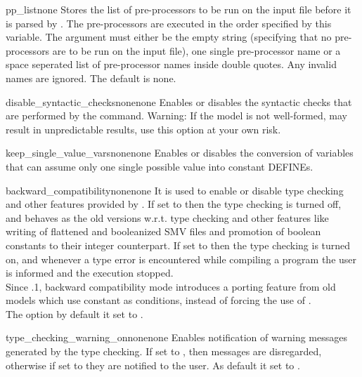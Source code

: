 \begin{nusmvVar} {pp\_list}{}{none}
Stores the list of pre-processors to be run on the input file before
it is parsed by \nusmv. The pre-processors are executed in the order
specified by this variable. The argument must either be the empty
string (specifying that no pre-processors are to be run on the input
file), one single pre-processor name or a space seperated list of
pre-processor names inside double quotes. Any invalid names are
ignored. The default is none.
\end{nusmvVar}



\begin{nusmvVar} {disable\_syntactic\_checks}{none}{none}
Enables or disables the syntactic checks that are performed by
the  command. Warning: If the model
is not well-formed, \nusmv may result in unpredictable results, use
this option at your own risk.
\end{nusmvVar}

\begin{nusmvVar} {keep\_single\_value\_vars}{none}{none}
Enables or disables the conversion of variables that can assume only
one single possible value into constant DEFINEs.
\end{nusmvVar}

\label{ref::backwardcompatibility}
\begin{nusmvVar} {backward\_compatibility}{none}{none}
  It is used to enable or disable type checking and other features
  provided by \NuSMV. If set to  then the type checking is
  turned off, and \nusmv behaves as the old versions w.r.t. type
  checking and other features like writing of flattened and
  booleanized SMV files and promotion of boolean constants to their
  integer counterpart. If set to  then the type checking is
  turned on, and whenever a type error is encountered while compiling
  a \nusmv program the user is informed and the execution stopped.
 \\

  Since .1, backward compatibility mode introduces a porting
  feature from old models which use constant  as 
  conditions, instead of forcing the use of .
\\

  The option by default it set to .
\end{nusmvVar}


\begin{nusmvVar}{type\_checking\_warning\_on}{none}{none}
  Enables notification of warning messages generated by the type
  checking. If set to , then messages are disregarded,
  otherwise if set to  they are notified to the user.
%
  As default it set to .
\end{nusmvVar}

